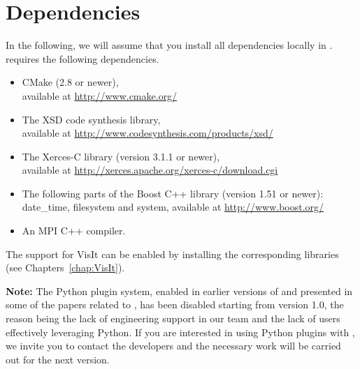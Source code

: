 

\section{Dependencies}\label{sec:dependencies}

In the following, we will assume that you install all dependencies locally in \installdir.
\Damaris{} requires the following dependencies.
\begin{itemize}
	\item CMake (2.8 or newer), \\ available at \url{http://www.cmake.org/}
	\item The XSD code synthesis library, \\ available at \url{http://www.codesynthesis.com/products/xsd/}
	\item The Xerces-C library (version 3.1.1 or newer), \\
	available at \url{http://xerces.apache.org/xerces-c/download.cgi}
	\item The following parts of the Boost C++ library (version 1.51 or newer): 
	date\_time, filesystem and system, available at \url{http://www.boost.org/}
	\item An MPI C++ compiler.
\end{itemize}

The support for VisIt can be enabled by installing the corresponding
libraries (see Chapters~\ref{chap:VisIt}).

\vspace{0.5cm}

\noindent\textbf{Note:} The Python plugin system, enabled in earlier versions of \Damaris{}
and presented in some of the papers related to \Damaris,
has been disabled starting from version 1.0, the reason being the lack of engineering 
support in our team and the lack of users effectively leveraging Python. If you are
interested in using Python plugins with \Damaris, we invite you to contact the developers
and the necessary work will be carried out for the next version.

